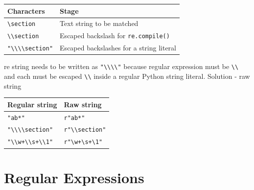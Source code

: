 \documentclass{beamer}
\begin{document}
\begin{frame}[fragile]
\begin{tabular}{ | l | p{7cm} |}
\hline
Characters & Stage \\ \hline
\verb/\section/ & Text string to be matched \\
\verb/\\section/ & Escaped backslash for \verb/re.compile()/ \\
\verb/"\\\\section"/ & Escaped backslashes for a string literal \\
\hline
\end{tabular}
\pause
re string needs to be written as \verb/"\\\\"/ because regular expression must be \verb/\\/ and each must be escaped \verb/\\/ inside a regular Python string literal.
\pause
Solution - raw string
\begin{tabular}{ | l | p{7cm} |}
\hline
Regular string & Raw string \\ \hline
\verb/"ab*"/ & \verb/r"ab*"/ \\
\verb/"\\\\section"/ & \verb/r"\\section"/ \\
\verb/"\\w+\\s+\\1"/ & \verb/r"\w+\s+\1"/ \\
\hline
\end{tabular}
\end{frame}

\section{Regular Expressions}
\end{document}
